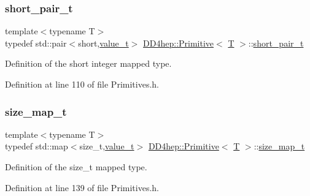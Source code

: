 \hypertarget{struct_d_d4hep_1_1_primitive_a50698733dd2401e05ee0d064ef856363}{}\label{struct_d_d4hep_1_1_primitive_a50698733dd2401e05ee0d064ef856363} 
\subsubsection{\texorpdfstring{short\+\_\+pair\+\_\+t}{short\_pair\_t}}
{\footnotesize\ttfamily template$<$typename T$>$ \\
typedef std\+::pair$<$short,\hyperlink{struct_d_d4hep_1_1_primitive_a0639e73bb8f07f99c2d8401f807a7af6}{value\+\_\+t}$>$ \hyperlink{struct_d_d4hep_1_1_primitive}{D\+D4hep\+::\+Primitive}$<$ \hyperlink{class_t}{T} $>$\+::\hyperlink{struct_d_d4hep_1_1_primitive_a50698733dd2401e05ee0d064ef856363}{short\+\_\+pair\+\_\+t}}



Definition of the short integer mapped type. 



Definition at line 110 of file Primitives.\+h.

\hypertarget{struct_d_d4hep_1_1_primitive_af954a6789fd528d13e6533a4bdb3aa21}{}\label{struct_d_d4hep_1_1_primitive_af954a6789fd528d13e6533a4bdb3aa21} 
\subsubsection{\texorpdfstring{size\+\_\+map\+\_\+t}{size\_map\_t}}
{\footnotesize\ttfamily template$<$typename T$>$ \\
typedef std\+::map$<$size\+\_\+t,\hyperlink{struct_d_d4hep_1_1_primitive_a0639e73bb8f07f99c2d8401f807a7af6}{value\+\_\+t}$>$ \hyperlink{struct_d_d4hep_1_1_primitive}{D\+D4hep\+::\+Primitive}$<$ \hyperlink{class_t}{T} $>$\+::\hyperlink{struct_d_d4hep_1_1_primitive_af954a6789fd528d13e6533a4bdb3aa21}{size\+\_\+map\+\_\+t}}



Definition of the size\+\_\+t mapped type. 



Definition at line 139 of file Primitives.\+h.

\hypertarget{struct_d_d4hep_1_1_primitive_a330a7f3f969e59b48e16c6054668f7d3}{}\label{struct_d_d4hep_1_1_primitive_a330a7f3f969e59b48e16c6054668f7d3} 
